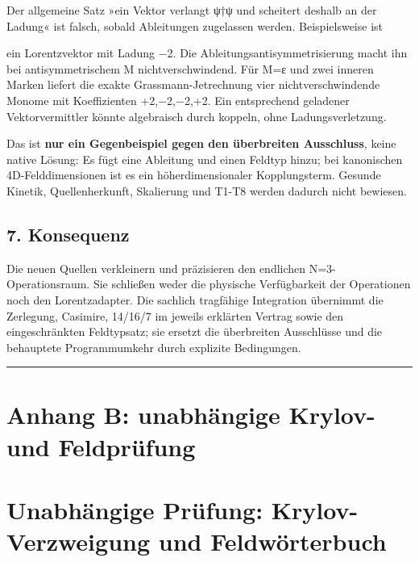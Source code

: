 Der allgemeine Satz »ein Vektor verlangt ψ†ψ und scheitert deshalb an
der Ladung« ist falsch, sobald Ableitungen zugelassen werden.
Beispielsweise ist


ein Lorentzvektor mit Ladung −2. Die Ableitungsantisymmetrisierung macht
ihn bei antisymmetrischem M nichtverschwindend. Für M=ε und zwei inneren
Marken liefert die exakte Grassmann-Jetrechnung vier nichtverschwindende
Monome mit Koeffizienten +2,−2,−2,+2. Ein entsprechend geladener
Vektorvermittler könnte algebraisch durch
 koppeln, ohne
Ladungsverletzung.

Das ist \textbf{nur ein Gegenbeispiel gegen den überbreiten Ausschluss},
keine native Lösung: Es fügt eine Ableitung und einen Feldtyp hinzu; bei
kanonischen 4D-Felddimensionen ist es ein höherdimensionaler
Kopplungsterm. Gesunde Kinetik, Quellenherkunft, Skalierung und T1-T8
werden dadurch nicht bewiesen.

\subsection{7. Konsequenz}\label{konsequenz}

Die neuen Quellen verkleinern und präzisieren den endlichen
N=3-Operationsraum. Sie schließen weder die physische Verfügbarkeit der
Operationen noch den Lorentzadapter. Die sachlich tragfähige Integration
übernimmt die Zerlegung, Casimire, 14/16/7 im jeweils erklärten Vertrag
sowie den eingeschränkten Feldtypsatz; sie ersetzt die überbreiten
Ausschlüsse und die behauptete Programmumkehr durch explizite
Bedingungen.

\begin{center}\rule{0.5\linewidth}{0.5pt}\end{center}

\section{Anhang B: unabhängige Krylov- und
Feldprüfung}\label{anhang-b-unabhuxe4ngige-krylov--und-feldpruxfcfung}

\section{Unabhängige Prüfung: Krylov-Verzweigung und
Feldwörterbuch}\label{unabhuxe4ngige-pruxfcfung-krylov-verzweigung-und-feldwuxf6rterbuch}


